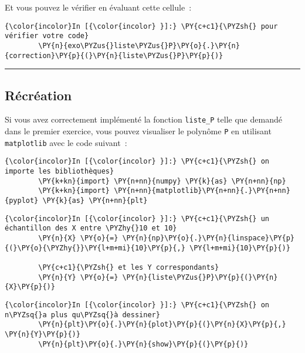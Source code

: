     Et vous pouvez le vérifier en évaluant cette cellule~:

    \begin{Verbatim}[commandchars=\\\{\}]
{\color{incolor}In [{\color{incolor} }]:} \PY{c+c1}{\PYZsh{} pour vérifier votre code}
        \PY{n}{exo\PYZus{}liste\PYZus{}P}\PY{o}{.}\PY{n}{correction}\PY{p}{(}\PY{n}{liste\PYZus{}P}\PY{p}{)}
\end{Verbatim}


    \begin{center}\rule{0.5\linewidth}{\linethickness}\end{center}

    \hypertarget{ruxe9cruxe9ation}{%
\subsection{Récréation}\label{ruxe9cruxe9ation}}

    Si vous avez correctement implémenté la fonction \texttt{liste\_P} telle
que demandé dans le premier exercice, vous pouvez visualiser le polynôme
\texttt{P} en utilisant \texttt{matplotlib} avec le code suivant~:

    \begin{Verbatim}[commandchars=\\\{\}]
{\color{incolor}In [{\color{incolor} }]:} \PY{c+c1}{\PYZsh{} on importe les bibliothèques}
        \PY{k+kn}{import} \PY{n+nn}{numpy} \PY{k}{as} \PY{n+nn}{np}
        \PY{k+kn}{import} \PY{n+nn}{matplotlib}\PY{n+nn}{.}\PY{n+nn}{pyplot} \PY{k}{as} \PY{n+nn}{plt}
\end{Verbatim}


    \begin{Verbatim}[commandchars=\\\{\}]
{\color{incolor}In [{\color{incolor} }]:} \PY{c+c1}{\PYZsh{} un échantillon des X entre \PYZhy{}10 et 10}
        \PY{n}{X} \PY{o}{=} \PY{n}{np}\PY{o}{.}\PY{n}{linspace}\PY{p}{(}\PY{o}{\PYZhy{}}\PY{l+m+mi}{10}\PY{p}{,} \PY{l+m+mi}{10}\PY{p}{)}
        
        \PY{c+c1}{\PYZsh{} et les Y correspondants}
        \PY{n}{Y} \PY{o}{=} \PY{n}{liste\PYZus{}P}\PY{p}{(}\PY{n}{X}\PY{p}{)}
\end{Verbatim}


    \begin{Verbatim}[commandchars=\\\{\}]
{\color{incolor}In [{\color{incolor} }]:} \PY{c+c1}{\PYZsh{} on n\PYZsq{}a plus qu\PYZsq{}à dessiner}
        \PY{n}{plt}\PY{o}{.}\PY{n}{plot}\PY{p}{(}\PY{n}{X}\PY{p}{,} \PY{n}{Y}\PY{p}{)}
        \PY{n}{plt}\PY{o}{.}\PY{n}{show}\PY{p}{(}\PY{p}{)}
\end{Verbatim}